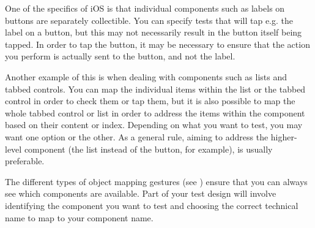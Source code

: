 
One of the specifics of iOS \gdauts{} is that individual components such as labels on buttons are separately collectible. You can specify tests that will tap e.g. the label on a button, but this may not necessarily result in the button itself being tapped. In order to tap the button, it may be necessary to ensure that the action you perform is actually sent to the button, and not the label. 

Another example of this is when dealing with components such as lists and tabbed controls. You can map the individual items within the list or the tabbed control in order to check them or tap them, but it is also possible to map the whole tabbed control or list in order to address the items within the component based on their content or index. Depending on what you want to test, you may want one option or the other. As a general rule, aiming to address the higher-level component (the list instead of the button, for example), is usually preferable. 


The different types of object mapping gestures (see ) ensure that you can always see which components are available. Part of your test design will involve identifying the component you want to test and choosing the correct technical name to map to your component name. 
